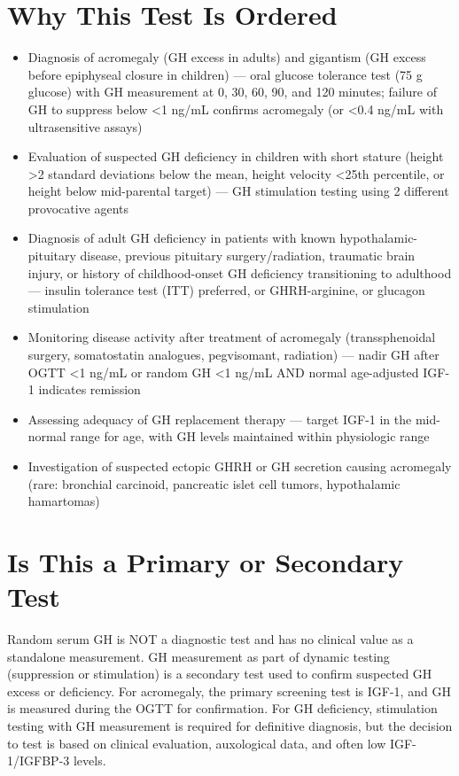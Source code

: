 \section*{Why This Test Is Ordered}
\begin{itemize}
  \item Diagnosis of acromegaly (GH excess in adults) and gigantism (GH excess before epiphyseal closure in children) --- oral glucose tolerance test (75 g glucose) with GH measurement at 0, 30, 60, 90, and 120 minutes; failure of GH to suppress below <1 ng/mL confirms acromegaly (or <0.4 ng/mL with ultrasensitive assays)
  \item Evaluation of suspected GH deficiency in children with short stature (height >2 standard deviations below the mean, height velocity <25th percentile, or height below mid-parental target) --- GH stimulation testing using 2 different provocative agents
  \item Diagnosis of adult GH deficiency in patients with known hypothalamic-pituitary disease, previous pituitary surgery/radiation, traumatic brain injury, or history of childhood-onset GH deficiency transitioning to adulthood --- insulin tolerance test (ITT) preferred, or GHRH-arginine, or glucagon stimulation
  \item Monitoring disease activity after treatment of acromegaly (transsphenoidal surgery, somatostatin analogues, pegvisomant, radiation) --- nadir GH after OGTT <1 ng/mL or random GH <1 ng/mL AND normal age-adjusted IGF-1 indicates remission
  \item Assessing adequacy of GH replacement therapy --- target IGF-1 in the mid-normal range for age, with GH levels maintained within physiologic range
  \item Investigation of suspected ectopic GHRH or GH secretion causing acromegaly (rare: bronchial carcinoid, pancreatic islet cell tumors, hypothalamic hamartomas)
\end{itemize}

\section*{Is This a Primary or Secondary Test}
Random serum GH is NOT a diagnostic test and has no clinical value as a standalone measurement. GH measurement as part of dynamic testing (suppression or stimulation) is a secondary test used to confirm suspected GH excess or deficiency. For acromegaly, the primary screening test is IGF-1, and GH is measured during the OGTT for confirmation. For GH deficiency, stimulation testing with GH measurement is required for definitive diagnosis, but the decision to test is based on clinical evaluation, auxological data, and often low IGF-1/IGFBP-3 levels.

